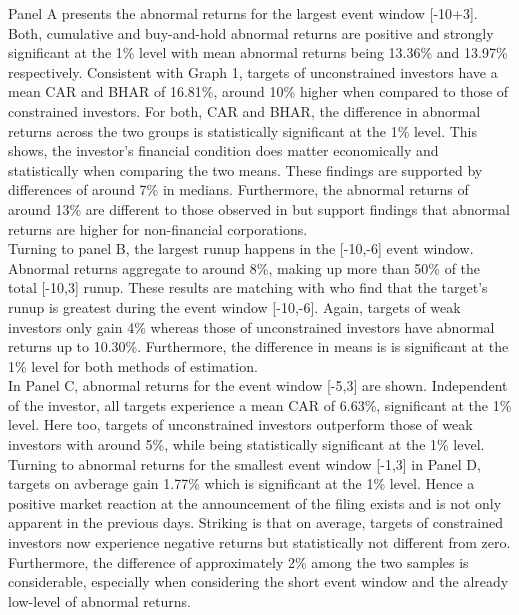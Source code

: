 \documentclass[12pt]{article}
\begin{document}
Panel A presents the abnormal returns for the largest event window [-10+3]. Both, cumulative and buy-and-hold abnormal returns are positive and strongly significant at the 1\% level with mean abnormal returns being 13.36\% and 13.97\% respectively. Consistent with Graph 1, targets of unconstrained investors have a mean CAR and BHAR of 16.81\%, around 10\% higher when compared to those of constrained investors. For both, CAR and BHAR, the difference in abnormal returns across the two groups is statistically significant at the 1\% level. This shows, the investor's financial condition does matter economically and statistically when comparing the two means. These findings are supported by differences of around 7\% in medians. Furthermore, the abnormal returns of around 13\% are different to those observed in \citet[p.208]{Klein2009} but support \citet[p.29]{Brigida2012} findings that abnormal returns are higher for non-financial corporations.\\
Turning to panel B, the largest runup happens in the [-10,-6] event window. Abnormal returns aggregate to around 8\%, making up more than 50\% of the total [-10,3] runup. These results are matching with \citet[p.32]{Brigida2012} who find that the target's runup is greatest during the event window [-10,-6]. Again, targets of weak investors only gain 4\% whereas those of unconstrained investors have abnormal returns up to 10.30\%. Furthermore, the difference in means is is significant at the 1\% level for both methods of estimation.\\
In Panel C, abnormal returns for the event window [-5,3] are shown. Independent of the investor, all targets experience a mean CAR of 6.63\%, significant at the 1\% level. Here too, targets of unconstrained investors outperform those of weak investors with around 5\%, while being statistically significant at the 1\% level.\\
Turning to abnormal returns for the smallest event window [-1,3] in Panel D, targets on avberage gain 1.77\% which is significant at the 1\% level. Hence a positive market reaction at the announcement of the filing exists and is not only apparent in the previous days. Striking is that on average, targets of constrained investors now experience negative returns but statistically not different from zero. Furthermore, the difference of approximately 2\%  among the two samples is considerable, especially  when considering the short event window and the already low-level of abnormal returns. 
\end{document}
